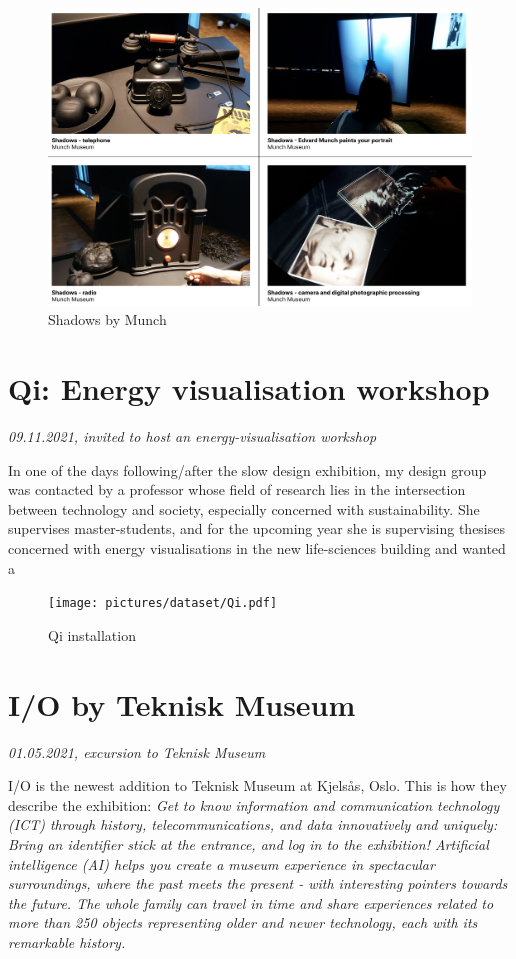 \begin{figure}[H]
    \centering 
    \includegraphics[width=18cm, angle=90]{pictures/dataset/munch_1.png}
    \caption{Shadows by Munch}
\end{figure}


\section{Qi: Energy visualisation workshop}
\emph{09.11.2021, invited to host an energy-visualisation workshop}

In one of the days following/after the slow design exhibition, my design group was contacted by a professor whose field of research lies in the intersection between technology and society, especially concerned with sustainability. She supervises master-students, and for the upcoming year she is supervising thesises concerned with energy visualisations in the new life-sciences building and wanted a 

\begin{figure}[H]
    \centering 
    \texttt{[image: pictures/dataset/Qi.pdf]}
    \caption{Qi installation}
\end{figure}


\section{I/O by Teknisk Museum}
\par
\emph{01.05.2021, excursion to Teknisk Museum}
\par

I/O is the newest addition to Teknisk Museum at Kjelsås, Oslo. This is how they describe the exhibition: \emph{Get to know information and communication technology (ICT) through history, telecommunications, and data innovatively and uniquely: Bring an identifier stick at the entrance, and log in to the exhibition! Artificial intelligence (AI) helps you create a museum experience in spectacular surroundings, where the past meets the present - with interesting pointers towards the future. The whole family can travel in time and share experiences related to more than 250 objects representing older and newer technology, each with its remarkable history.} \autocite{tekniskmuseum_2022}


